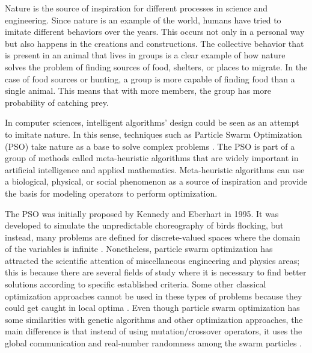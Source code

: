 Nature is the source of inspiration for different processes in science and engineering. Since nature is an example of the world, humans have tried to imitate different behaviors over the years. This occurs not only in a personal way but also happens in the creations and constructions. The collective behavior that is present in an animal that lives in groups is a clear example of how nature solves the problem of finding sources of food, shelters, or places to migrate. In the case of food sources or hunting, a group is more capable of finding food than a single animal. This means that with more members, the group has more probability of catching prey. 

In computer sciences, intelligent algorithms' design could be seen as an attempt to imitate nature. In this sense, techniques such as Particle Swarm Optimization (PSO) take nature as a base to solve complex problems \cite{kennedy1995particle}. The PSO is part of a group of methods called meta-heuristic algorithms that are widely important in artificial intelligence and applied mathematics. Meta-heuristic algorithms can use a biological, physical, or social phenomenon as a source of inspiration and provide the basis for modeling operators to perform optimization.


The PSO was initially proposed by Kennedy and Eberhart in 1995. It was developed to simulate the unpredictable choreography of birds flocking, but instead, many problems are defined for discrete-valued spaces where the domain of the variables is infinite \cite{kennedy1995particle}. Nonetheless, particle swarm optimization has attracted the scientific attention of miscellaneous engineering and physics areas; this is because there are several fields of study where it is necessary to find better solutions according to specific established criteria. Some other classical optimization approaches cannot be used in these types of problems because they could get caught in local optima \cite{janeza2009pso}. Even though particle swarm optimization has some similarities with genetic algorithms and other optimization approaches, the main difference is that instead of using mutation/crossover operators, it uses the global communication and real-number randomness among the swarm particles \cite{yang2010nature}.

